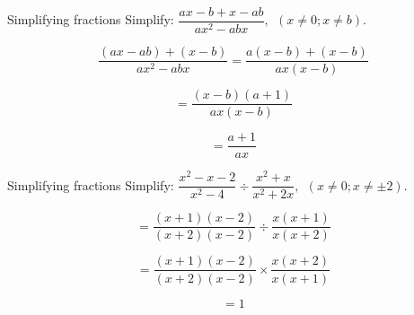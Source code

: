 \par
{}
\begin{wex}{Simplifying fractions}
{Simplify: $\dfrac{ax-b+x-ab}{a{x}^{2}-abx}, ~~(x \neq 0;x \neq b)$.}
{
\begin{equation*}
  \dfrac{(ax-ab)+(x-b)}{a{x}^{2}-abx} = \dfrac{a(x-b)+(x-b)}{ax(x-b)}
\end{equation*}

\begin{equation*}
  = \dfrac{(x-b)(a+1)}{ax(x-b)}
\end{equation*}

\begin{equation*}
  = \dfrac{a+1}{ax}
\end{equation*}
}
\end{wex}


\begin{wex}{Simplifying fractions}
{Simplify: $\dfrac{{x}^{2}-x-2}{{x}^{2}-4}÷\dfrac{{x}^{2}+x}{{x}^{2}+2x}, ~~(x \neq 0;x \neq \pm2)$.}{
\begin{equation*}
  = \dfrac{(x+1)(x-2)}{(x+2)(x-2)}÷\dfrac{x(x+1)}{x(x+2)}
\end{equation*}

\begin{equation*}
  = \dfrac{(x+1)(x-2)}{(x+2)(x-2)}\ensuremath{\times}\dfrac{x(x+2)}{x(x+1)}
\end{equation*}

\begin{equation*}
  = 1
\end{equation*}
}
\end{wex}

